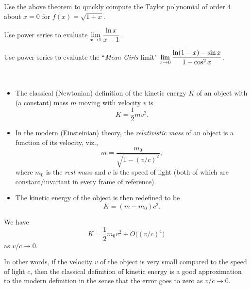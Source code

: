 \begin{example}
Use the above theorem to quickly compute the Taylor polynomial of order $4$ about $x=0$ for $f(x)=\sqrt{1+x}$.
\end{example}

\newpage

\begin{example}
Use power series to evaluate $\displaystyle\lim_{x\to 1}\frac{\ln x}{x-1}$.
\end{example}

\newpage

\begin{example}
Use power series to evaluate the ``\textit{Mean Girls} limit"
$\displaystyle\lim_{x\to 0}\frac{\ln(1-x)-\sin x}{1-\cos^2 x}$.
\end{example}

\newpage

\begin{remark}\,
\begin{itemize}
\item The classical (Newtonian) definition of the kinetic energy $K$ of an object with (a constant) mass $m$ moving with velocity $v$ is
\begin{equation*}
K= \frac{1}{2}mv^2.
\end{equation*}
\item In the modern (Einsteinian) theory, the \textit{relativistic mass} of an object is a function of its velocity, viz.,
\begin{equation*}
m = \frac{m_0}{\sqrt{1-(v/c)^2}},
\end{equation*}
where $m_0$ is the \textit{rest mass} and $c$ is the speed of light (both of which are constant/invariant in every frame of reference).
\item The kinetic energy of the object is then redefined to be
\begin{equation*}
K = (m-m_0)c^2.
\end{equation*}
\end{itemize}
\end{remark}

\begin{theorem}
We have
\begin{equation*}
K = \frac{1}{2}m_0v^2 + O\bigg((v/c)^4\bigg)
\end{equation*}
as $v/c\to 0$.
\end{theorem}
\begin{remark}
In other words, if the velocity $v$ of the object is very small compared to the speed of light $c$, then the classical definition of kinetic energy is a good approximation to the modern definition in the sense that the error goes to zero as $v/c\to 0$.
\end{remark}

